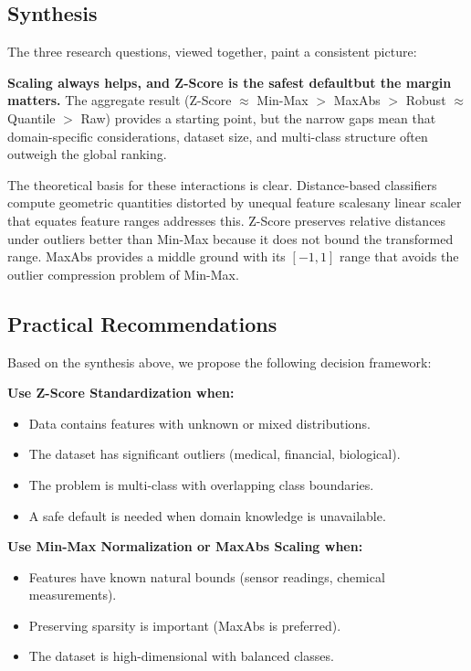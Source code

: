 \documentclass[12pt,a4paper]{article}
\begin{document}
\subsection{Synthesis}
\label{sec:synthesis}

The three research questions, viewed together, paint a consistent picture:

\textbf{Scaling always helps, and Z-Score is the safest default\textemdash but the margin matters.} The aggregate result (Z-Score $\approx$ Min-Max $>$ MaxAbs $>$ Robust $\approx$ Quantile $>$ Raw) provides a starting point, but the narrow gaps mean that domain-specific considerations, dataset size, and multi-class structure often outweigh the global ranking.

The theoretical basis for these interactions is clear. Distance-based classifiers compute geometric quantities distorted by unequal feature scales\textemdash any linear scaler that equates feature ranges addresses this. Z-Score preserves relative distances under outliers better than Min-Max because it does not bound the transformed range. MaxAbs provides a middle ground with its $[-1, 1]$ range that avoids the outlier compression problem of Min-Max.

\subsection{Practical Recommendations}
\label{sec:recommendations}

Based on the synthesis above, we propose the following decision framework:

\textbf{Use Z-Score Standardization when:}
\begin{itemize}
  \item Data contains features with unknown or mixed distributions.
  \item The dataset has significant outliers (medical, financial, biological).
  \item The problem is multi-class with overlapping class boundaries.
  \item A safe default is needed when domain knowledge is unavailable.
\end{itemize}

\textbf{Use Min-Max Normalization or MaxAbs Scaling when:}
\begin{itemize}
  \item Features have known natural bounds (sensor readings, chemical measurements).
  \item Preserving sparsity is important (MaxAbs is preferred).
  \item The dataset is high-dimensional with balanced classes.
\end{itemize}
\end{document}

